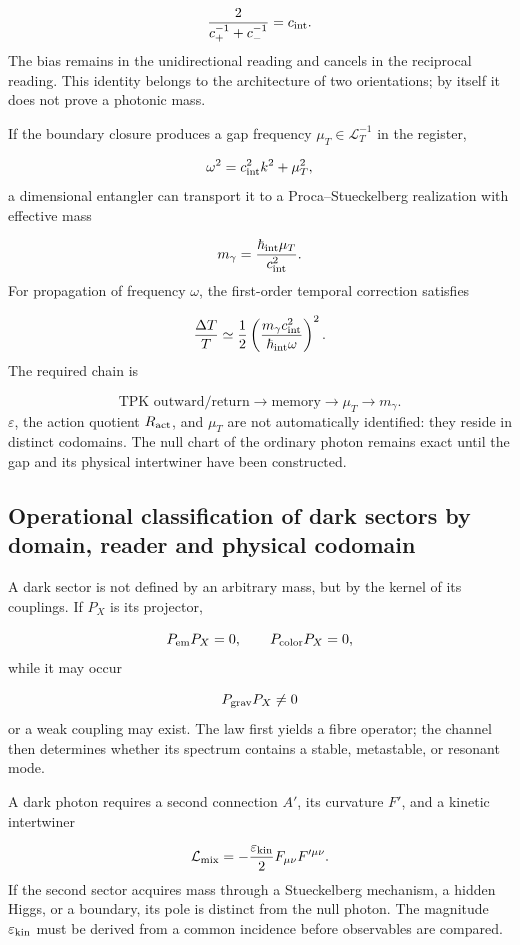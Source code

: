 \[
\frac{2}{c_+^{-1}+c_-^{-1}}=c_{\rm int}.
\]
The bias remains in the unidirectional reading and cancels in the reciprocal reading. This identity belongs to the architecture of two orientations; by itself it does not prove a photonic mass.

If the boundary closure produces a gap frequency \(\mu_T\in\mathcal L_T^{-1}\) in the register,

\[
\omega^2=c_{\rm int}^{2}k^2+\mu_T^2,
\]
a dimensional entangler can transport it to a Proca--Stueckelberg realization with effective mass

\[
m_\gamma=\frac{\hbar_{\rm int}\mu_T}{c_{\rm int}^{2}}.
\]
For propagation of frequency \(\omega\), the first-order temporal correction satisfies

\[
\frac{\Delta T}{T}
\simeq
\frac12
\left(
\frac{m_\gamma c_{\rm int}^{2}}
     {\hbar_{\rm int}\omega}
\right)^2.
\]
The required chain is

\[
\text{TPK outward/return}
\longrightarrow
\text{memory}
\longrightarrow
\mu_T
\longrightarrow
m_\gamma.
\]
\(\varepsilon\), the action quotient \(R_{\rm act}\), and \(\mu_T\) are not automatically identified: they reside in distinct codomains. The null chart of the ordinary photon remains exact until the gap and its physical intertwiner have been constructed.

\subsection{Operational classification of dark sectors by domain, reader and physical codomain}
A dark sector is not defined by an arbitrary mass, but by the kernel of its couplings. If \(P_X\) is its projector,

\[
P_{\rm em}P_X=0,
\qquad
P_{\rm color}P_X=0,
\]
while it may occur

\[
P_{\rm grav}P_X\ne0
\]
or a weak coupling may exist. The law first yields a fibre operator; the channel then determines whether its spectrum contains a stable, metastable, or resonant mode.

A dark photon requires a second connection \(A'\), its curvature \(F'\), and a kinetic intertwiner

\[
\mathcal L_{\rm mix}
=-\frac{\varepsilon_{\rm kin}}2F_{\mu\nu}F'^{\mu\nu}.
\]
If the second sector acquires mass through a Stueckelberg mechanism, a hidden Higgs, or a boundary, its pole is distinct from the null photon. The magnitude \(\varepsilon_{\rm kin}\) must be derived from a common incidence before observables are compared.

